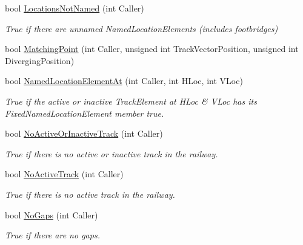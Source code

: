 \begin{DoxyCompactItemize}
bool \mbox{\hyperlink{class_t_track_ad7d7ef450424ea6aab50db5445c6448c}{Locations\+Not\+Named}} (int Caller)
\begin{DoxyCompactList}\small\item\em True if there are unnamed Named\+Location\+Elements (includes footbridges) \end{DoxyCompactList}\item 
bool \mbox{\hyperlink{class_t_track_aa60a7460b2d95189e8de3817e4ad21f2}{Matching\+Point}} (int Caller, unsigned int Track\+Vector\+Position, unsigned int Diverging\+Position)
\item 
\mbox{\label{class_t_track_a198ba6486ccb7cdfb25bdd8c30451d06}} 
bool \mbox{\hyperlink{class_t_track_a198ba6486ccb7cdfb25bdd8c30451d06}{Named\+Location\+Element\+At}} (int Caller, int H\+Loc, int V\+Loc)
\begin{DoxyCompactList}\small\item\em True if the active or inactive Track\+Element at H\+Loc \& V\+Loc has its Fixed\+Named\+Location\+Element member true. \end{DoxyCompactList}\item 
\mbox{\label{class_t_track_ab20c55ecbc1801614695279daa8da0ba}} 
bool \mbox{\hyperlink{class_t_track_ab20c55ecbc1801614695279daa8da0ba}{No\+Active\+Or\+Inactive\+Track}} (int Caller)
\begin{DoxyCompactList}\small\item\em True if there is no active or inactive track in the railway. \end{DoxyCompactList}\item 
\mbox{\label{class_t_track_a2eaa84532799b76a0b42cf6e2611224d}} 
bool \mbox{\hyperlink{class_t_track_a2eaa84532799b76a0b42cf6e2611224d}{No\+Active\+Track}} (int Caller)
\begin{DoxyCompactList}\small\item\em True if there is no active track in the railway. \end{DoxyCompactList}\item 
\mbox{\label{class_t_track_ab9e1aa42b1d6399d97390f5068bf68b0}} 
bool \mbox{\hyperlink{class_t_track_ab9e1aa42b1d6399d97390f5068bf68b0}{No\+Gaps}} (int Caller)
\begin{DoxyCompactList}\small\item\em True if there are no gaps. \end{DoxyCompactList}\item 

\end{DoxyCompactItemize}
